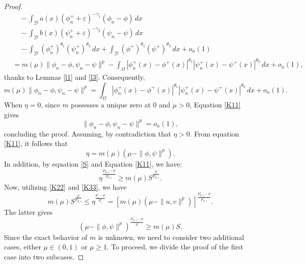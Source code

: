 \documentclass[10pt,a4paper]{amsart}
\numberwithin{equation}{section}
\begin{document}
\begin{proof}
\begin{align*}
&\quad -\int_\mathcal{D}a(x)(\phi_n^++\varepsilon)^{-\gamma_1}(\phi_n-\phi)\,dx\\
&\quad -\int_\mathcal{D}b(x)(\psi_n^++\varepsilon)^{-\gamma_2}(\psi_n-\psi)\,dx\\
&\quad -\int_\mathcal{D}(\phi_n^+)^{\theta_1}(\psi_n^+)^{\theta_2}\,dx
 +\int_\mathcal{D}(\phi^+)^{\theta_1}(\psi^+)^{\theta_2}\,dx+ o_n(1)  \\
&=m(\mu)\| \phi_n-\phi,\psi_n-\psi\|^p
 -\int_\Omega |\phi^+_n(x)-\phi^+(x)|^{\theta_1}|\psi^+_n(x)
 -\psi^+(x)|^{\theta_2}\,dx+o_n(1),
\end{align*}
thanks to Lemmas \ref{l1} and \ref{l3}. Consequently,
\begin{equation}\label{K11}
m(\mu)\| \phi_n-\phi,\psi_n-\psi\|^p=\int_\Omega |\phi^+_n(x)
-\phi^+(x)|^{\theta_1}|\psi^+_n(x)-\psi^+(x)|^{\theta_2}\,dx+o_n(1).
\end{equation}
When $\eta=0$, since $m$ possesses a unique zero at $0$ and $\mu>0$, Equation \eqref{K11}
gives
$$
\|\phi_n-\phi,\psi_n-\psi\|^p=o_n(1),
$$
concluding the proof.  Assuming, by contradiction that $\eta>0$.
From equation \eqref{K11}, it follows that
\begin{equation}\label{K22}
\eta=m(\mu)\left(\mu-\|\phi,\psi\|^p\right).
\end{equation}
In addition, by equation \eqref{S} and Equation \eqref{K11}, we have:
\begin{equation}\label{K33}
\eta^\frac{p^\star_{N,s}-p}{p^\star_{N,s}}\geq m(\mu)S^\frac{p}{p^\star_{N,s}}.
\end{equation}
Now, utilizing  \eqref{K22} and \eqref{K33}, we have
\begin{equation}\label{K44}
m(\mu)S^\frac{p}{p^\star_{N,s}}\leq \eta^\frac{p^\star_s-p}{p^\star_s}=\left[m(\mu)\left(\mu-\| u,v\|^p\right)\right]^\frac{p^\star_{N,s}-p}{p^\star_{N,s}}.
\end{equation}
The latter gives
\begin{equation}\label{K54}
\left(\mu-\| \phi,\psi \|^p\right)^\frac{p^\star_{N,s}-p}{p}\geq m(\mu) S.
\end{equation}
Since the exact behavior of $m$ is unknown, we need to consider two additional cases,
either $\mu\in (0,1)$ or $\mu\geq 1$.  To proceed, we divide the proof of the first
 case into two subcases.
\smallskip


\end{proof}
\end{document}
